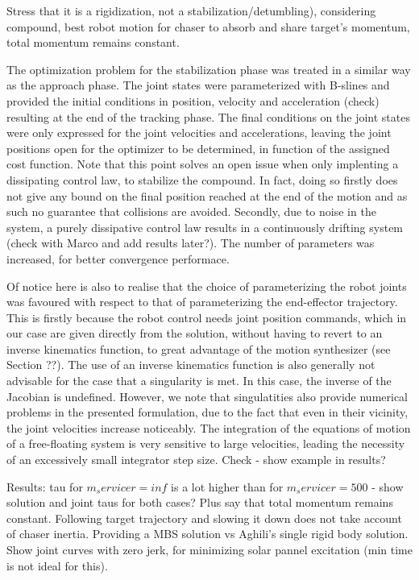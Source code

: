 Stress that it is a rigidization, not a stabilization/detumbling), considering compound, best robot motion for chaser to absorb and share target's momentum, total momentum remains constant.

The optimization problem for the stabilization phase was treated in a similar way as the approach phase. The joint states were parameterized with B-slines and provided the initial conditions in position, velocity and acceleration (check) resulting at the end of the tracking phase. The final conditions on the joint states were only expressed for the joint velocities and accelerations, leaving the joint positions open for the optimizer to be determined, in function of the assigned cost function. Note that this point solves an open issue when only implenting a dissipating control law, to stabilize the compound. In fact, doing so firstly does not give any bound on the final position reached at the end of the motion and as such no guarantee that collisions are avoided. Secondly, due to noise in the system, a purely dissipative control law results in a continuously drifting system (check with Marco and add results later?). The number of parameters was increased, for better convergence performace. 

Of notice here is also to realise that the choice of parameterizing the robot joints was favoured with respect to that of parameterizing the end-effector trajectory. This is firstly because the robot control needs joint position commands, which in our case are given directly from the solution, without having to revert to an inverse kinematics function, to great advantage of the motion synthesizer (see Section ??). The use of an inverse kinematics function is also generally not advisable for the case that a singularity is met. In this case, the inverse of the Jacobian is undefined. However, we note that singulatities also provide numerical problems in the presented formulation, due to the fact that even in their vicinity, the joint velocities increase noticeably. The integration of the equations of motion of a free-floating system is very sensitive to large velocities, leading the necessity of an excessively small integrator step size. Check - show example in results?

Results: tau for $m_servicer = inf$ is a lot higher than for $m_servicer = 500$ - show solution and joint taus for both cases? Plus say that total momentum remains constant. Following target trajectory and slowing it down does not take account of chaser inertia. Providing a MBS solution vs Aghili's single rigid body solution. Show joint curves with zero jerk, for minimizing solar pannel excitation (min time is not ideal for this).

